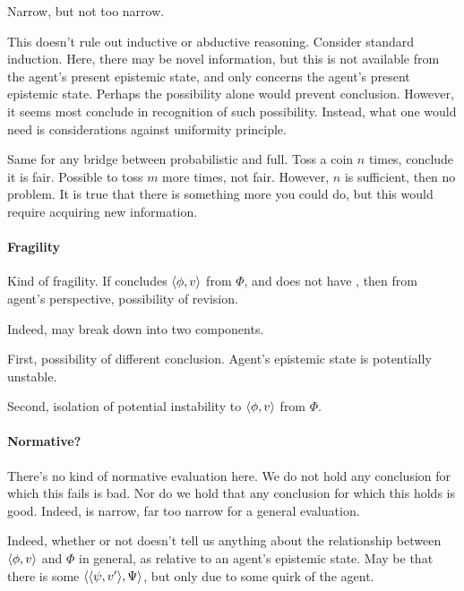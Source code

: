 \begin{note}
  Narrow, but not too narrow.
\end{note}

\begin{note}
  This doesn't rule out inductive or abductive reasoning.
  Consider standard induction.
  Here, there may be novel information, but this is not available from the agent's present epistemic state, and \qzS{} only concerns the agent's present epistemic state.
  Perhaps the possibility alone would prevent conclusion.
  However, it seems most conclude in recognition of such possibility.
  Instead, what one would need is considerations against uniformity principle.

  Same for any bridge between probabilistic and full.
  Toss a coin \(n\) times, conclude it is fair.
  Possible to toss \(m\) more times, not fair.
  However, \(n\) is sufficient, then no problem.
  It is true that there is something more you could do, but this would require acquiring new information.
\end{note}



\paragraph*{Fragility}

\begin{note}
  Kind of fragility.
  If concludes \(\langle \phi, v \rangle\) from \(\Phi\), and does not have \zS{}, then from agent's perspective, possibility of revision.

  Indeed, may break down into two components.

  First, possibility of different conclusion.
  Agent's epistemic state is potentially unstable.

  Second, isolation of potential instability to \(\langle \phi, v \rangle\) from \(\Phi\).
\end{note}


\paragraph*{Normative?}

\begin{note}
  There's no kind of normative evaluation here.
  We do not hold any conclusion for which this fails is bad.
  Nor do we hold that any conclusion for which this holds is good.
  Indeed, \zS{} is narrow, far too narrow for a general evaluation.

  Indeed, whether or not \zS{} doesn't tell us anything about the relationship between \(\langle \phi, v \rangle\) and \(\Phi\) in general, as relative to an agent's epistemic state.
  May be that there is some \(\langle \langle \psi, v' \rangle, \Psi \rangle\), but only due to some quirk of the agent.
\end{note}

